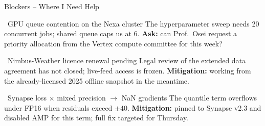 \begin{frame}{Blockers -- Where I Need Help}

\begin{blockerBox}{\faExclamationTriangle\ GPU queue contention on the Nexa cluster}
  \small The hyperparameter sweep needs 20 concurrent jobs; shared queue caps us at 6.
  \textbf{Ask:} can Prof.\ Osei request a priority allocation from the Vertex compute committee for this week?
\end{blockerBox}

\vspace{0.12cm}
\begin{blockerBox}{\faExclamationTriangle\ Nimbus-Weather licence renewal pending}
  \small Legal review of the extended data agreement has not closed; live-feed access is frozen.
  \textbf{Mitigation:} working from the already-licensed 2025 offline snapshot in the meantime.
\end{blockerBox}

\vspace{0.12cm}
\begin{blockerBox}{\faExclamationTriangle\ Synapse loss $\times$ mixed precision $\to$ NaN gradients}
  \small The quantile term overflows under FP16 when residuals exceed $\pm 40$.
  \textbf{Mitigation:} pinned to Synapse v2.3 and disabled AMP for this term; full fix targeted for Thursday.
\end{blockerBox}

\end{frame}
